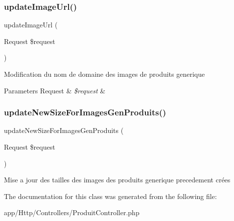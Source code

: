 \subsubsection{\texorpdfstring{update\+Image\+Url()}{updateImageUrl()}}
{\footnotesize\ttfamily update\+Image\+Url (\begin{DoxyParamCaption}\item[{Request}]{\$request }\end{DoxyParamCaption})}

Modification du nom de domaine des images de produits generique 
\begin{DoxyParams}[1]{Parameters}
Request & {\em \$request} & \\
\hline
\end{DoxyParams}
\mbox{\label{class_app_1_1_http_1_1_controllers_1_1_produit_controller_af2e34d5afd9726d5e0df41c2bf24d043}} 
\subsubsection{\texorpdfstring{update\+New\+Size\+For\+Images\+Gen\+Produits()}{updateNewSizeForImagesGenProduits()}}
{\footnotesize\ttfamily update\+New\+Size\+For\+Images\+Gen\+Produits (\begin{DoxyParamCaption}\item[{Request}]{\$request }\end{DoxyParamCaption})}

Mise a jour des tailles des images des produits generique precedement crées 

The documentation for this class was generated from the following file\+:\begin{DoxyCompactItemize}
\item 
app/\+Http/\+Controllers/Produit\+Controller.\+php\end{DoxyCompactItemize}
